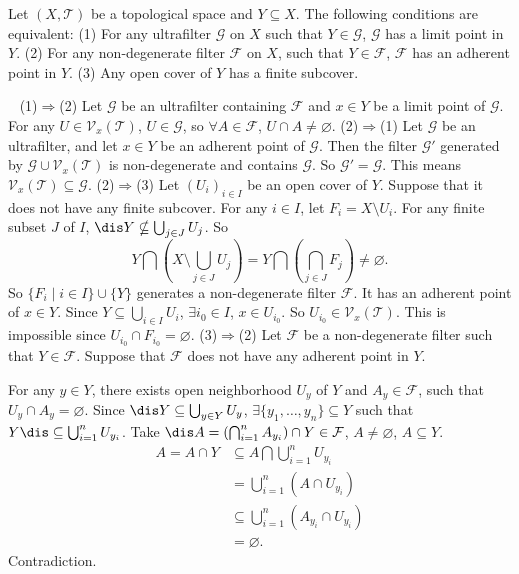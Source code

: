 \begin{propositionenv}
    Let $\left(X,\mathscr{T}\right)$ be a topological space and $Y\subseteq X$. The following conditions are equivalent:
    \newline
    (1) For any ultrafilter $\mathcal{G}$ on $X$ such that $Y\in \mathcal{G}$, $\mathcal{G}$ has a limit point in $Y$.
    \newline
    (2) For any non-degenerate filter $\mathcal{F}$ on $X$, such that $Y\in \mathcal{F}$, $\mathcal{F}$ has an adherent point in $Y$.
    \newline
    (3) Any open cover of $Y$ has a finite subcover.
\end{propositionenv}
\begin{proofenv}
    \ \newline
    (1)$\Rightarrow$(2) Let $\mathcal{G}$ be an ultrafilter containing $\mathcal{F}$ and $x\in Y$ be a limit point of $\mathcal{G}$. For any $U\in \mathcal{V}_x\left(\mathscr{T}\right)$, $U\in \mathcal{G}$, so $\forall A\in \mathcal{F}$, $U\cap A\neq\varnothing$.
    \newline
    (2)$\Rightarrow$(1) Let $\mathcal{G}$ be an ultrafilter, and let $x\in Y$ be an adherent point of $\mathcal{G}$. Then the filter $\mathcal{G}'$ generated by $\mathcal{G}\cup\mathcal{V}_x(\mathscr{T})$ is non-degenerate and contains $\mathcal{G}$. So $\mathcal{G}'=\mathcal{G}$. This means $\mathcal{V}_x(\mathscr{T})\subseteq\mathcal{G}$.
    \newline
    (2)$\Rightarrow$(3) Let $(U_i)_{ i\in I}$ be an open cover of $Y$. Suppose that it does not have any finite subcover. For any $i\in I$, let $F_i=X\setminus U_i$. For any finite subset $J$ of $I$, $\dis Y\nsubseteq  \bigcup_{j\in J}U_j$. So
    $$Y\bigcap\left(X\setminus \bigcup_{j\in J}U_j\right)=Y\bigcap\left(\bigcap_{j\in J}F_j\right)\neq\varnothing.$$
    So $\{F_i\mid i\in I\}\cup\{Y\}$ generates a non-degenerate filter $\mathcal{F}$. It has an adherent point of $x\in Y$. Since $Y\subseteq \bigcup_{i\in I}U_i$, $\exists i_0\in I$, $x\in U_{i_0}$. So $U_{i_0}\in \mathcal{V}_x(\mathscr{T})$. This is impossible since $U_{i_0}\cap F_{i_0}=\varnothing.$
    \newline
    (3)$\Rightarrow$(2) Let $\mathcal{F}$ be a non-degenerate filter such that $Y\in \mathcal{F}$. Suppose that $\mathcal{F}$ does not have any adherent point in $Y$.

    \quad For any $y\in Y$, there exists open neighborhood $U_y$ of $Y$ and $A_y\in \mathcal{F}$, such that $U_y\cap A_y=\varnothing$. Since $\dis Y\subseteq\bigcup_{y\in Y}U_y$, $\exists \{y_1,\ldots,y_n\}\subseteq Y$ such that $Y\dis\subseteq\bigcup_{i=1}^n U_{y_i}$. Take $\dis A=\left(\bigcap_{i=1}^nA_{y_i}\right)\cap Y\in \mathcal{F}$, $A\neq \varnothing$, $A\subseteq Y$.
    \begin{align*}
        A=A\cap Y&\subseteq A\bigcap \bigcup_{i=1}^n U_{y_i}\\
        &=\bigcup_{i=1}^n\left(A\cap U_{y_i}\right)\\
        &\subseteq \bigcup_{i=1}^n\left(A_{y_i}\cap U_{y_i}\right)\\
        &=\varnothing.
    \end{align*}
    Contradiction.
\end{proofenv}
